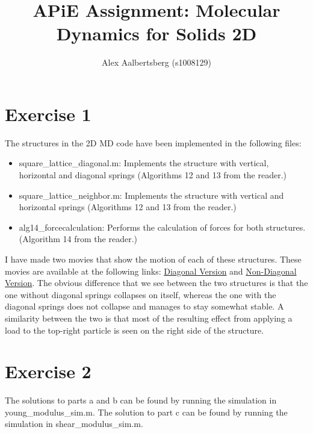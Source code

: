 \documentclass[12pt, a4paper]{article}
\begin{document}
	\author{Alex Aalbertsberg (s1008129)}	
	\title{APiE Assignment: Molecular Dynamics for Solids 2D}
	\maketitle
	\part*{Exercise 1}
	The structures in the 2D MD code have been implemented in the following files:
	\begin{itemize}
		\item square\_lattice\_diagonal.m: Implements the structure with vertical, horizontal and diagonal springs (Algorithms 12 and 13 from the reader.)
		\item square\_lattice\_neighbor.m: Implements the structure with vertical and horizontal springs (Algorithms 12 and 13 from the reader.)
		\item alg14\_forcecalculation: Performs the calculation of forces for both structures. (Algorithm 14 from the reader.)
	\end{itemize}
	I have made two movies that show the motion of each of these structures. These movies are available at the following links:
	\href{https://youtu.be/-DFHmNt2nXk}{Diagonal Version} and \href{https://youtu.be/YFORNO8G_cY}{Non-Diagonal Version}.
	The obvious difference that we see between the two structures is that the one without diagonal springs collapses on itself, whereas the one with the diagonal springs does not collapse and manages to stay somewhat stable. A similarity between the two is that most of the resulting effect from applying a load to the top-right particle is seen on the right side of the structure.
	\part*{Exercise 2}
	The solutions to parts a and b can be found by running the simulation in young\_modulus\_sim.m.
	The solution to part c can be found by running the simulation in shear\_modulus\_sim.m.
\end{document}
